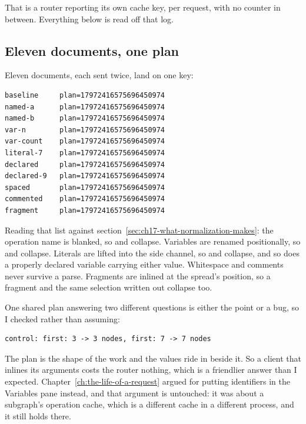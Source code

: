 That is a router reporting its own cache key, per request, with no counter in
between. Everything below is read off that log.

\subsection*{Eleven documents, one plan}

%
Eleven documents, each sent twice, land on one key:

\begin{verbatim}
baseline     plan=17972416575696450974
named-a      plan=17972416575696450974
named-b      plan=17972416575696450974
var-n        plan=17972416575696450974
var-count    plan=17972416575696450974
literal-7    plan=17972416575696450974
declared     plan=17972416575696450974
declared-9   plan=17972416575696450974
spaced       plan=17972416575696450974
commented    plan=17972416575696450974
fragment     plan=17972416575696450974
\end{verbatim}

Reading that list against
section~\ref{sec:ch17-what-normalization-makes}: the operation name is blanked,
so  and  collapse. Variables are renamed
positionally, so  and  collapse. Literals are lifted
into the side channel, so  and  collapse, and so
does a properly declared variable carrying either value. Whitespace and comments
never survive a parse. Fragments are inlined at the spread's position, so a
fragment and the same selection written out collapse too.

%
One shared plan answering two different questions is either the point or a bug,
so I checked rather than assuming:

\begin{verbatim}
control: first: 3 -> 3 nodes, first: 7 -> 7 nodes
\end{verbatim}

The plan is the shape of the work and the values ride in beside it. So a client
that inlines its arguments costs the router nothing, which is a friendlier
answer than I expected. Chapter~\ref{ch:the-life-of-a-request} argued for
putting identifiers in the Variables pane instead, and that argument is
untouched: it was about a subgraph's operation cache, which is a different cache
in a different process, and it still holds there.

